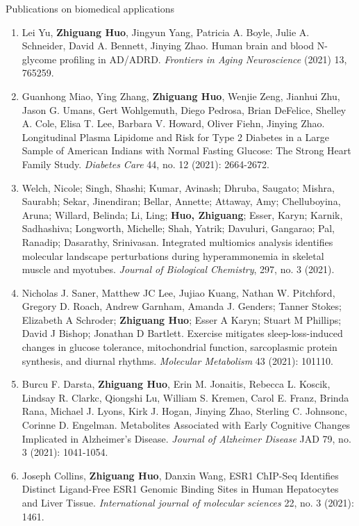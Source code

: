 \documentclass{resume} %
\begin{document}
\begin{rSection}{Publications on biomedical applications}
\begin{enumerate}[noitemsep,topsep=0pt, resume]
\item
Lei Yu, {\bf Zhiguang Huo}, Jingyun Yang, Patricia A. Boyle, Julie A. Schneider, David A. Bennett, Jinying Zhao.
Human brain and blood N-glycome profiling in AD/ADRD.
\emph{Frontiers in Aging Neuroscience} (2021) 13, 765259. 

\item
Guanhong Miao, Ying Zhang, {\bf Zhiguang Huo}, Wenjie Zeng, Jianhui Zhu, Jason G. Umans, Gert Wohlgemuth, Diego Pedrosa, Brian DeFelice, Shelley A. Cole, Elisa T. Lee, Barbara V. Howard, Oliver Fiehn, Jinying Zhao.
Longitudinal Plasma Lipidome and Risk for Type 2 Diabetes in a Large Sample of American Indians with Normal Fasting Glucose: The Strong Heart Family Study. 
\emph{Diabetes Care}  44, no. 12 (2021): 2664-2672.


\item
Welch, Nicole; Singh, Shashi; Kumar, Avinash; Dhruba, Saugato; Mishra, Saurabh; Sekar, Jinendiran; Bellar, Annette; Attaway, Amy; Chelluboyina, Aruna; Willard, Belinda; Li, Ling; {\bf Huo, Zhiguang}; Esser, Karyn; Karnik, Sadhashiva; Longworth, Michelle; Shah, Yatrik; Davuluri, Gangarao; Pal, Ranadip; Dasarathy, Srinivasan.
Integrated multiomics analysis identifies molecular landscape perturbations during hyperammonemia in skeletal muscle and myotubes. 
\emph{Journal of Biological Chemistry}, 297, no. 3 (2021).


\item  
Nicholas J. Saner, Matthew JC Lee, Jujiao Kuang, Nathan W. Pitchford, Gregory D. Roach, Andrew Garnham, Amanda J. Genders; Tanner Stokes; Elizabeth A Schroder; {\bf Zhiguang Huo}; Esser A Karyn; Stuart M Phillips; David J Bishop; Jonathan D Bartlett.
Exercise mitigates sleep-loss-induced changes in glucose tolerance, mitochondrial function, sarcoplasmic protein synthesis, and diurnal rhythms.
\emph{Molecular Metabolism} 43 (2021): 101110.

\item  
Burcu F. Darsta, {\bf Zhiguang Huo}, Erin M. Jonaitis, Rebecca L. Koscik, Lindsay R. Clarkc, Qiongshi Lu, William S. Kremen, Carol E. Franz, Brinda Rana, Michael J. Lyons, Kirk J. Hogan, Jinying Zhao, Sterling C. Johnsonc, Corinne D. Engelman.
Metabolites Associated with Early Cognitive Changes Implicated in Alzheimer's Disease.
\emph{Journal of Alzheimer Disease} JAD 79, no. 3 (2021): 1041-1054.


\item  Joseph Collins, {\bf Zhiguang Huo}, Danxin Wang, 
ESR1 ChIP-Seq Identifies Distinct Ligand-Free ESR1 Genomic Binding Sites in Human Hepatocytes and Liver Tissue.
\emph{International journal of molecular sciences} 22, no. 3 (2021): 1461.


\end{enumerate}
\end{rSection}
\end{document}
